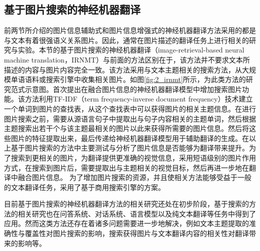 \subsection{基于图片搜索的神经机器翻译}

前两节所介绍的图片信息辅助式和图片信息增强式的神经机器翻译方法采用的都是与文本有着很强语义关系图片。因此，通常在图片描述的翻译任务上进行相关的研究与实验。本节的基于图片搜索的神经机器翻译（image-retrieval-based neural machine translation，IRNMT）与前面的方法区别在于，该方法并不要求文本所描述的内容与图片内容完全一致。该方法采用与文本主题相关的搜索方法，从大规模单语语料或搜索引擎中收集相关图片。如图\ref{fig:2_irnmt}所示，为此类方法的研究范式示意图。首次提出在融合图片信息的神经机器翻译模型中增加搜索图片功能。该方法利用TF-IDF（term frequency-inverse document frequency）技术建立一个单词到图片的查找表，从这个查找表中可以获得图片的相关主题信息。在进行图片搜索之前，需要从源语言句子中提取出与句子内容相关的主题单词，然后根据主题搜索出若干个与该主题最相关的图片以此来获得所需要的图片信息。然后将这些图片的特征提取出来，最后传递给神经机器翻译模型用于辅助翻译的生成。在以上基于图片搜索的方法中主要测试与分析了图片信息是否能够为翻译带来提升。为了搜索到更相关的图片，为翻译提供更准确的视觉信息，采用短语级别的图片作用方式，在搜索到图片后，需要提取出与主题相关的视觉目标，然后再进一步地在翻译中融合图片信息。
为了增加图片搜索的资源，并且使相关方法能够受益于一般的文本翻译任务，采用了基于商用搜索引擎的方案。

目前基于图片搜索的神经机器翻译方法的相关研究还处在初步阶段，基于搜索的方法的相关研究也在问答系统、对话系统、语言模型以及纯文本翻译等任务中得到了应用。然而这类方法还存在着诸多问题需要进一步地解决，例如文本主题提取的准确性与覆盖性对图片搜索的影响，搜索获得图片与文本翻译内容的相关性对翻译带来的影响等。
